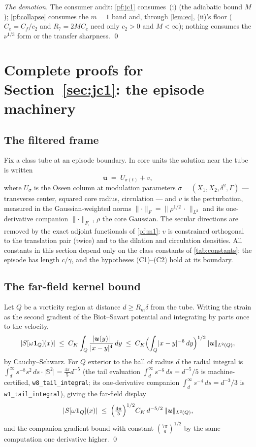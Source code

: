 \documentclass[11pt,letterpaper]{amsart}
\theoremstyle{definition}
\theoremstyle{remark}
\newcommand{\om}{\omega}
\newcommand{\uu}{\boldsymbol{u}}
\newcommand{\norm}[1]{\lVert #1 \rVert}
\newcommand{\abs}[1]{\lvert #1 \rvert}
\begin{document}
\emph{The demotion.} The consumer audit: \cref{pf:jc1} consumes~(i) (the
adiabatic bound $M$); \cref{pf:collapse} consumes the $m=1$ band and, through
\cref{lem:ec}, (ii)'s floor ($C_e=C_f/c_2$ and $R_7=2MC_e$ need only $c_2>0$
and $M<\infty$); nothing consumes the $\nu^{1/3}$ form or the transfer
sharpness. \qed

\section{Complete proofs for Section~\ref{sec:jc1}: the episode machinery}\label{pfsec:jc1}

\subsection{The filtered frame}\label{pf:frame}
Fix a class tube at an episode boundary. In core units the solution near the tube is
written
\[
\uu \;=\; U_{\sigma(t)} + v,
\]
where $U_\sigma$ is the Oseen column at modulation parameters
$\sigma=(X_1,X_2,\delta^2,\Gamma)$ --- transverse center, squared core radius,
circulation --- and $v$ is the perturbation, measured in the Gaussian-weighted norms
$\norm{\cdot}_F=\norm{\rho^{1/2}\,\cdot\,}_{L^2}$ and its one-derivative companion
$\norm{\cdot}_{F_1}$, $\rho$ the core Gaussian. The secular directions are removed by
the exact adjoint functionals of \cref{pf:m1}: $v$ is constrained orthogonal to the
translation pair (twice) and to the dilation and circulation densities. All constants
in this section depend only on the class constants of \cref{tab:constants}; the
episode has length $c/\gamma$, and the hypotheses (C1)--(C2) hold at its boundary.

\subsection{The far-field kernel bound}\label{pf:w1}
Let $Q$ be a vorticity region at distance $d\ge R_m\delta$ from the tube. Writing the
strain as the second gradient of the Biot--Savart potential and integrating by parts
once to the velocity,
\[
\abs{S[\om\mathbf{1}_Q](x)}\;\le\;C_{K}\int_Q\frac{\abs{\uu(y)}}{\abs{x-y}^{4}}\,dy
\;\le\;C_K\Bigl(\int_Q\abs{x-y}^{-8}\,dy\Bigr)^{1/2}\norm{\uu}_{L^2(Q)},
\]
by Cauchy--Schwarz. For $Q$ exterior to the ball of radius $d$ the radial integral is
$\int_d^\infty s^{-8}s^2\,ds\cdot\abs{\mathbb{S}^2}=\tfrac{4\pi}{5}d^{-5}$
(the tail evaluation $\int_d^\infty s^{-6}\,ds=d^{-5}/5$ is machine-certified,
\texttt{w8\_tail\_integral}; its one-derivative companion
$\int_d^\infty s^{-4}\,ds=d^{-3}/3$ is \texttt{w1\_tail\_integral}), giving the
far-field display
\[
\abs{S[\om\mathbf{1}_Q](x)}\;\le\;\Bigl(\tfrac{4\pi}{5}\Bigr)^{1/2} C_K\,
d^{-5/2}\,\norm{\uu}_{L^2(Q)} ,
\]
and the companion gradient bound with constant $(\tfrac{7\pi}{6})^{1/2}$ by the same
computation one derivative higher. \qed
\end{document}
